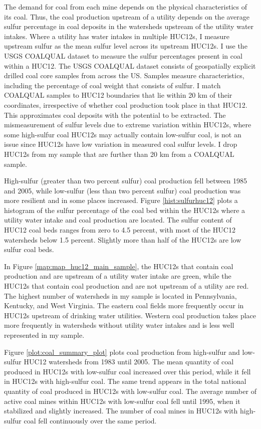\documentclass[12pt]{article}
\begin{document}
The demand for coal from each mine depends on the physical characteristics of its coal. Thus, the coal production upstream of a utility depends on the average sulfur percentage in coal deposits in the watersheds upstream of the utility water intakes. Where a utility has water intakes in multiple HUC12s, I measure upstream sulfur as the mean sulfur level across its upstream HUC12s. I use the USGS COALQUAL dataset to measure the sulfur percentages present in coal within a HUC12. The USGS COALQUAL dataset consists of geospatially explicit drilled coal core samples from across the US. Samples measure characteristics, including the percentage of coal weight that consists of sulfur. I match COALQUAL samples to HUC12 boundaries that lie within 20 km of their coordinates, irrespective of whether coal production took place in that HUC12. This approximates coal deposits with the potential to be extracted. The mismeasurement of sulfur levels due to extreme variation within HUC12s, where some high-sulfur coal HUC12s may actually contain low-sulfur coal, is not an issue since HUC12s have low variation in measured coal sulfur levels. I drop HUC12s from my sample that are further than 20 km from a COALQUAL sample. 


High-sulfur (greater than two percent sulfur) coal production fell between 1985 and 2005, while low-sulfur (less than two percent sulfur) coal production was more resilient and in some places increased. Figure \ref{hist:sulfurhuc12} plots a histogram of the sulfur percentage of the coal bed within the HUC12s where a utility water intake and coal production are located. The sulfur content of HUC12 coal beds ranges from zero to 4.5 percent, with most of the HUC12 watersheds below 1.5 percent. Slightly more than half of the HUC12s are low sulfur coal beds.  

In Figure \ref{map:map_huc12_main_sample}, the HUC12s that contain coal production and are upstream of a utility water intake are green, while the HUC12s that contain coal production and are not upstream of a utility are red. The highest number of watersheds in my sample is located in Pennsylvania, Kentucky, and West Virginia. The eastern coal fields more frequently occur in HUC12s upstream of drinking water utilities. Western coal production takes place more frequently in watersheds without utility water intakes and is less well represented in my sample.

Figure \ref{plot:coal_summary_plot} plots coal production from high-sulfur and low-sulfur HUC12 watersheds from 1983 until 2005. The mean quantity of coal produced in HUC12s with low-sulfur coal increased over this period, while it fell in HUC12s with high-sulfur coal. The same trend appears in the total national quantity of coal produced in HUC12s with low-sulfur coal. The average number of active coal mines within HUC12s with low-sulfur coal fell until 1995, when it stabilized and slightly increased. The number of coal mines in HUC12s with high-sulfur coal fell continuously over the same period.
\end{document}
